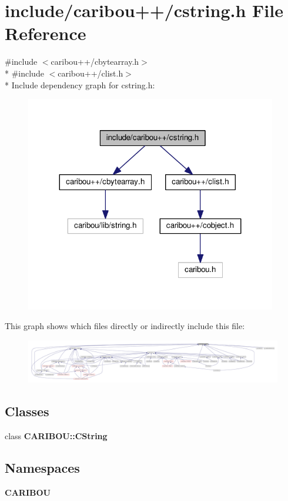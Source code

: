 \section{include/caribou++/cstring.h File Reference}
\label{cstring_8h}
{\ttfamily \#include $<$caribou++/cbytearray.\+h$>$}\\*
{\ttfamily \#include $<$caribou++/clist.\+h$>$}\\*
Include dependency graph for cstring.\+h\+:
\nopagebreak
\begin{figure}[H]
\begin{center}
\leavevmode
\includegraphics[width=311pt]{cstring_8h__incl}
\end{center}
\end{figure}
This graph shows which files directly or indirectly include this file\+:
\nopagebreak
\begin{figure}[H]
\begin{center}
\leavevmode
\includegraphics[width=350pt]{cstring_8h__dep__incl}
\end{center}
\end{figure}
\subsection*{Classes}
\begin{DoxyCompactItemize}
\item 
class {\bf C\+A\+R\+I\+B\+O\+U\+::\+C\+String}
\end{DoxyCompactItemize}
\subsection*{Namespaces}
\begin{DoxyCompactItemize}
\item 
 {\bf C\+A\+R\+I\+B\+OU}
\end{DoxyCompactItemize}
